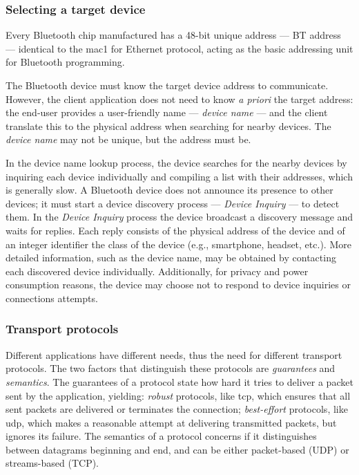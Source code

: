 \subsubsection{Selecting a target device}%
\label{sec:bt-target-device}
Every Bluetooth chip manufactured has a 48-bit unique address --- BT address ---
identical to the \gls{mac1} for Ethernet protocol, acting as the basic addressing
unit for Bluetooth programming.

The Bluetooth device must know the target device address to
communicate. However, the client application does not need to know \textit{a
  priori} the target address: the end-user provides a user-friendly name ---
\textit{device name} --- and the client translate this to the physical address
when searching for nearby devices. The \textit{device name} may not be unique,
but the address must be.

In the device name lookup process, the device searches for the nearby devices by
inquiring each device individually and compiling a list with their addresses,
which is generally slow. A
Bluetooth device does not announce its presence to other devices; it must start
a device discovery process --- \textit{Device Inquiry} --- to detect them. In
the \textit{Device Inquiry} process the device broadcast a discovery message and
waits for replies. Each reply consists of the physical address of the device and
of an integer identifier the class of the device (e.g., smartphone, headset,
etc.). More detailed information, such as the device name, may be obtained by
contacting each discovered device individually. Additionally, for privacy and
power consumption reasons, the device may choose not to respond to device
inquiries or connections attempts.
%
\subsubsection{Transport protocols}%
\label{sec:bt-transport-protocols}
%
Different applications have different needs, thus the need for different
transport protocols. The two factors that distinguish these protocols are
\textit{guarantees} and \textit{semantics}. The guarantees of a protocol state
how hard it tries to deliver a packet sent by the application, yielding:
\emph{robust} protocols, like \gls{tcp}, which ensures that all sent packets are
delivered or terminates the connection; \emph{best-effort} protocols, like \gls{udp},
which makes a reasonable attempt at delivering transmitted packets, but ignores
its failure. The semantics of a protocol concerns if it distinguishes between
datagrams beginning and end, and can be either packet-based (UDP) or
streams-based (TCP).

